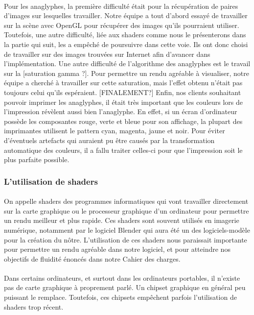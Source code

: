 \paragraph{}
Pour les anaglyphes, la première difficulté était pour la récupération de paires d'images sur lesquelles travailler. Notre équipe a tout d'abord essayé de travailler sur la scène avec OpenGL pour récupérer des images qu'ils pourraient utiliser. Toutefois, une autre difficulté, liée aux shaders comme nous le présenterons dans la partie qui suit, les a empêché de poursuivre dans cette voie. Ils ont donc choisi de travailler sur des images trouvées sur Internet afin d'avancer dans l'implémentation. 
Une autre difficulté de l'algorithme des anaglyphes est le travail sur la [saturation gamma ?]. Pour permettre un rendu agréable à visualiser, notre équipe a cherché à travailler sur cette saturation, mais l'effet obtenu n'était pas toujours celui qu'ils espéraient. [FINALEMENT?]
Enfin, nos clients souhaitant pouvoir imprimer les anaglyphes, il était très important que les couleurs lors de l'impression révèlent aussi bien l'anaglyphe. En effet, si un écran d'ordinateur possède les composantes rouge, verte et bleue pour son affichage, la plupart des imprimantes utilisent le pattern cyan, magenta, jaune et noir. Pour éviter d'éventuels artefacts qui auraient pu être causés par la transformation automatique des couleurs, il a fallu traiter celles-ci pour que l'impression soit le plus parfaite possible.

\subsubsection{L'utilisation de shaders}
\paragraph{}
On appelle shaders des programmes informatiques qui vont travailler directement sur la carte graphique ou le processeur graphique d'un ordinateur pour permettre un rendu meilleur et plus rapide. Ces shaders sont souvent utilisés en imagerie numérique, notamment par le logiciel Blender qui aura été un des logiciels-modèle pour la création du nôtre. L'utilisation de ces shaders nous paraissait importante pour permettre un rendu agréable dans notre logiciel, et pour atteindre nos objectifs de fluidité énoncés dans notre Cahier des charges.

\paragraph{}
Dans certains ordinateurs, et surtout dans les ordinateurs portables, il n'existe pas de carte graphique à proprement parlé. Un chipset graphique en général peu puissant le remplace. Toutefois, ces chipsets empêchent parfois l'utilisation de shaders trop récent.

